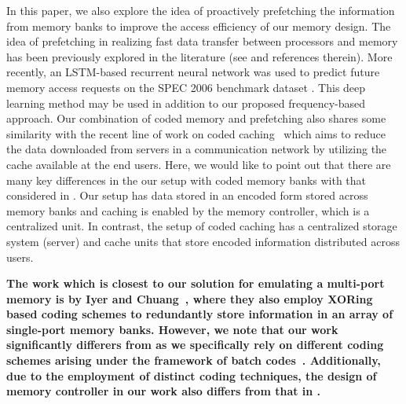 In this paper, we also explore the idea of proactively prefetching the information from memory banks to improve the access efficiency of our memory design. The idea of prefetching in realizing fast data transfer between processors and memory has been previously explored in the literature (see \cite{Kim2016, Kadjo2014, Shevgoor2015, JL2013} and references therein). 
More recently, an LSTM-based recurrent neural network was used to predict future memory access requests on the SPEC 2006 benchmark dataset \cite{lstm2018}. This deep learning method may be used in addition to our proposed frequency-based approach.
Our combination of coded memory and prefetching also shares some similarity with the recent line of work on coded caching~\cite{MN16a} which aims to reduce the data downloaded from servers in a communication network by utilizing the cache available at the end users. Here, we would like to point out that there are many key differences in the our setup with coded memory banks with that considered in \cite{MN16a}. Our setup has data stored in an encoded form stored across memory banks and caching is enabled by the memory controller, which is a centralized unit. In contrast, the setup of coded caching has a centralized storage system (server) and cache units that store encoded information distributed across users.

{\color{red} {\bf The work which is closest to our solution for emulating a multi-port memory is by Iyer and Chuang~\cite{Memoir_xor, Memoir_xor_virtual}, where they also employ XORing based coding schemes to redundantly store information in an array of single-port memory banks. However, we note that our work significantly differers from \cite{Memoir_xor, Memoir_xor_virtual} as we specifically rely on different coding schemes arising under the framework of batch codes~\cite{batchcodes}. Additionally, due to the employment of distinct coding techniques, the design of memory controller in our work also differs from that in \cite{Memoir_xor, Memoir_xor_virtual}.}}


